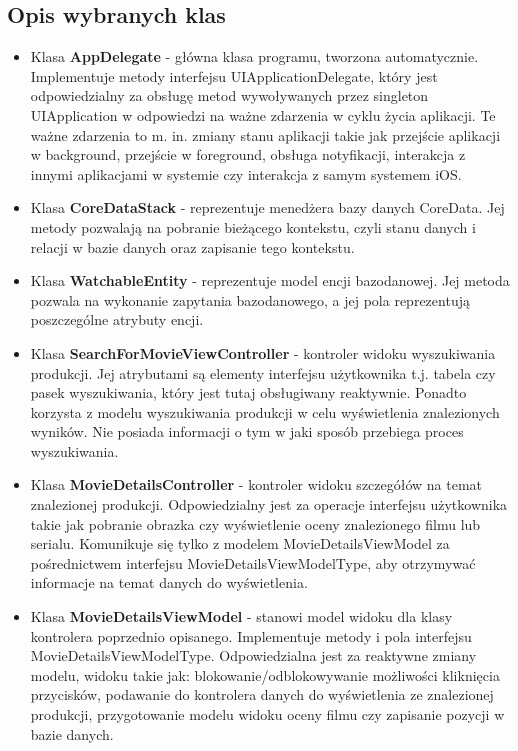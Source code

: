 \documentclass[12pt,oneside,a4paper]{report}
\begin{document}
\subsection{Opis wybranych klas}
\begin{itemize}
	\item Klasa \textbf{AppDelegate} - główna klasa programu, tworzona automatycznie. Implementuje metody interfejsu UIApplicationDelegate, który jest odpowiedzialny za obsługę metod wywoływanych przez singleton UIApplication w odpowiedzi na ważne zdarzenia w cyklu życia aplikacji. Te ważne zdarzenia to m. in. zmiany stanu aplikacji takie jak przejście aplikacji w background, przejście w foreground, obsługa notyfikacji, interakcja z innymi aplikacjami w systemie czy interakcja z samym systemem iOS.
	\item Klasa \textbf{CoreDataStack} -  reprezentuje menedżera bazy danych CoreData. Jej metody pozwalają na pobranie bieżącego kontekstu, czyli stanu danych i relacji w bazie danych oraz zapisanie tego kontekstu.
	\item Klasa \textbf{WatchableEntity} - reprezentuje model encji bazodanowej. Jej metoda pozwala na wykonanie zapytania bazodanowego, a jej pola reprezentują poszczególne atrybuty encji.
	\item Klasa \textbf{SearchForMovieViewController} - kontroler widoku wyszukiwania produkcji. Jej atrybutami są elementy interfejsu użytkownika t.j. tabela czy pasek wyszukiwania, który jest tutaj obsługiwany reaktywnie. Ponadto korzysta z modelu wyszukiwania produkcji w celu wyświetlenia znalezionych wyników. Nie posiada informacji o tym w jaki sposób przebiega proces wyszukiwania. 
	\item Klasa \textbf{MovieDetailsController} - kontroler widoku szczegółów na temat znalezionej produkcji. Odpowiedzialny jest za operacje interfejsu użytkownika takie jak pobranie obrazka czy wyświetlenie oceny znalezionego filmu lub serialu. Komunikuje się tylko z modelem MovieDetailsViewModel za pośrednictwem interfejsu MovieDetailsViewModelType, aby otrzymywać informacje na temat danych do wyświetlenia.
	\item Klasa \textbf{MovieDetailsViewModel} - stanowi model widoku dla klasy kontrolera poprzednio opisanego. Implementuje metody i pola interfejsu MovieDetailsViewModelType. Odpowiedzialna jest za reaktywne zmiany modelu, widoku takie jak: blokowanie/odblokowywanie możliwości kliknięcia przycisków, podawanie do kontrolera danych do wyświetlenia ze znalezionej produkcji, przygotowanie modelu widoku oceny filmu czy zapisanie pozycji w bazie danych. 

\end{itemize}
\end{document}
